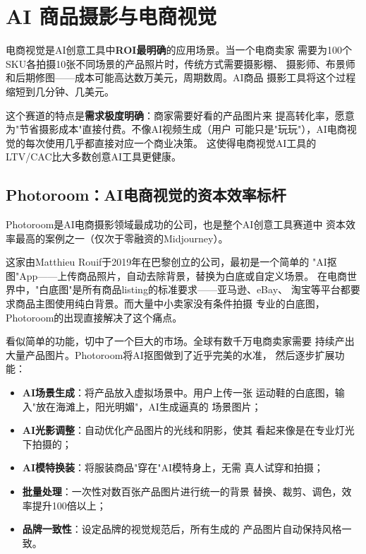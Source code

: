 \section{AI 商品摄影与电商视觉}
\label{sec:create-ecommerce}

电商视觉是AI创意工具中\textbf{ROI最明确}的应用场景。当一个电商卖家
需要为100个SKU各拍摄10张不同场景的产品照片时，传统方式需要摄影棚、
摄影师、布景师和后期修图——成本可能高达数万美元，周期数周。AI商品
摄影工具将这个过程缩短到几分钟、几美元。

这个赛道的特点是\textbf{需求极度明确}：商家需要好看的产品图片来
提高转化率，愿意为"节省摄影成本"直接付费。不像AI视频生成（用户
可能只是"玩玩"），AI电商视觉的每次使用几乎都直接对应一个商业决策。
这使得电商视觉AI工具的LTV/CAC比大多数创意AI工具更健康。

\subsection{Photoroom：AI电商视觉的资本效率标杆}
\label{subsec:photoroom}

Photoroom是AI电商摄影领域最成功的公司，也是整个AI创意工具赛道中
资本效率最高的案例之一（仅次于零融资的Midjourney）。

这家由Matthieu Rouif于2019年在巴黎创立的公司，最初是一个简单的
"AI抠图"App——上传商品照片，自动去除背景，替换为白底或自定义场景。
在电商世界中，"白底图"是所有商品listing的标准要求——亚马逊、eBay、
淘宝等平台都要求商品主图使用纯白背景。而大量中小卖家没有条件拍摄
专业的白底图，Photoroom的出现直接解决了这个痛点。

看似简单的功能，切中了一个巨大的市场。全球有数千万电商卖家需要
持续产出大量产品图片。Photoroom将AI抠图做到了近乎完美的水准，
然后逐步扩展功能：
\begin{itemize}
  \item \textbf{AI场景生成}：将产品放入虚拟场景中。用户上传一张
    运动鞋的白底图，输入"放在海滩上，阳光明媚"，AI生成逼真的
    场景图片；
  \item \textbf{AI光影调整}：自动优化产品图片的光线和阴影，使其
    看起来像是在专业灯光下拍摄的；
  \item \textbf{AI模特换装}：将服装商品"穿在"AI模特身上，无需
    真人试穿和拍摄；
  \item \textbf{批量处理}：一次性对数百张产品图片进行统一的背景
    替换、裁剪、调色，效率提升100倍以上；
  \item \textbf{品牌一致性}：设定品牌的视觉规范后，所有生成的
    产品图片自动保持风格一致。
\end{itemize}

